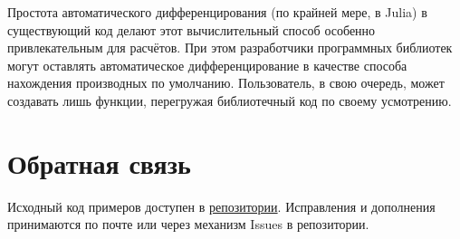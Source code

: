 \documentclass{article}
\theoremstyle{definition}
\begin{document}
Простота  автоматического дифференцирования (по крайней мере, в Julia) в существующий код делают этот вычислительный способ особенно привлекательным для расчётов. При этом разработчики программных библиотек могут оставлять автоматическое дифференцирование в качестве способа нахождения производных по умолчанию. Пользователь, в свою очередь, может создавать лишь функции, перегружая библиотечный код по своему усмотрению.


\section{Обратная связь}
Исходный код примеров доступен в \href{https://github.com/stepanzh/ANoteOnDualNumbersAndAutodiff}{репозитории}. Исправления и дополнения принимаются по почте или через механизм Issues в репозитории.

\printbibliography
\end{document}
